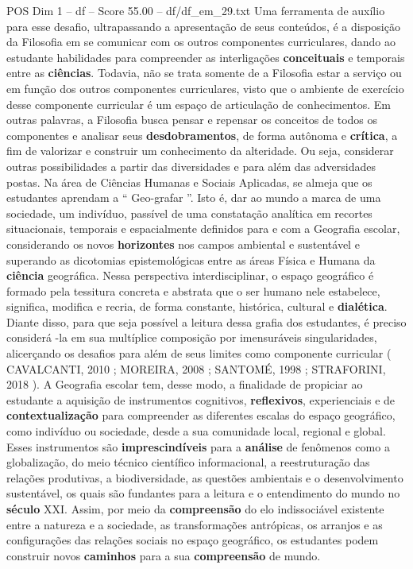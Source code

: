 \begin{textsample}{POS Dim 1 – df – Score 55.00 – df/df\_em\_29.txt}
Uma ferramenta de auxílio para esse desafio, ultrapassando a apresentação de seus conteúdos, é a disposição da Filosofia em se comunicar com os outros componentes curriculares, dando ao estudante habilidades para compreender as interligações \textbf{conceituais} e temporais entre as \textbf{ciências}.
Todavia, não se trata somente de a Filosofia estar a serviço ou em função dos outros componentes curriculares, visto que o ambiente de exercício desse componente curricular é um espaço de articulação de conhecimentos.
Em outras palavras, a Filosofia busca pensar e repensar os conceitos de todos os componentes e analisar seus \textbf{desdobramentos}, de forma autônoma e \textbf{crítica}, a fim de valorizar e construir um conhecimento da alteridade.
Ou seja, considerar outras possibilidades a partir das diversidades e para além das adversidades postas.
Na área de Ciências Humanas e Sociais Aplicadas, se almeja que os estudantes aprendam a “ Geo-grafar ”.
Isto é, dar ao mundo a marca de uma sociedade, um indivíduo, passível de uma constatação analítica em recortes situacionais, temporais e espacialmente definidos para e com a Geografia escolar, considerando os novos \textbf{horizontes} nos campos ambiental e sustentável e superando as dicotomias epistemológicas entre as áreas Física e Humana da \textbf{ciência} geográfica.
Nessa perspectiva interdisciplinar, o espaço geográfico é formado pela tessitura concreta e abstrata que o ser humano nele estabelece, significa, modifica e recria, de forma constante, histórica, cultural e \textbf{dialética}.
Diante disso, para que seja possível a leitura dessa grafia dos estudantes, é preciso considerá -la em sua multíplice composição por imensuráveis singularidades, alicerçando os desafios para além de seus limites como componente curricular ( CAVALCANTI, 2010 ; MOREIRA, 2008 ; SANTOMÉ, 1998 ; STRAFORINI, 2018 ).
A Geografia escolar tem, desse modo, a finalidade de propiciar ao estudante a aquisição de instrumentos cognitivos, \textbf{reflexivos}, experienciais e de \textbf{contextualização} para compreender as diferentes escalas do espaço geográfico, como indivíduo ou sociedade, desde a sua comunidade local, regional e global.
Esses instrumentos são \textbf{imprescindíveis} para a \textbf{análise} de fenômenos como a globalização, do meio técnico científico informacional, a reestruturação das relações produtivas, a biodiversidade, as questões ambientais e o desenvolvimento sustentável, os quais são fundantes para a leitura e o entendimento do mundo no \textbf{século} XXI.
Assim, por meio da \textbf{compreensão} do elo indissociável existente entre a natureza e a sociedade, as transformações antrópicas, os arranjos e as configurações das relações sociais no espaço geográfico, os estudantes podem construir novos \textbf{caminhos} para a sua \textbf{compreensão} de mundo.

\end{textsample}
